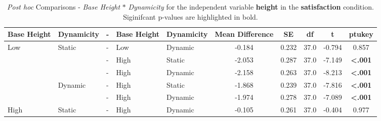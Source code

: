 \begin{table*}[ht]
    \centering
    \caption{\textit{Post hoc} Comparisons - \textit{Base Height} $\ast$ \textit{Dynamicity} for the independent variable \textbf{height} in the \textbf{satisfaction} condition. Siginifcant p-values are highlighted in bold.}
    \begin{tabular}{lllll|ccccc}
    \toprule
    \textbf{Base Height} & \textbf{Dynamicity} & -  & \textbf{Base Height} & \textbf{Dynamicity} & \textbf{Mean Difference} & \textbf{SE} & \textbf{df} & \textbf{t} & \textbf{ptukey} \\
    \midrule
    Low                  & Static              & - & Low                   & Dynamic             & -0.184                   & 0.232       & 37.0        & -0.794     & 0.857           \\
                         &                     & - & High                  & Static              & -2.053                   & 0.287       & 37.0        & -7.149     & \textbf{<.001}                      \\
                         &                     & - & High                  & Dynamic             & -2.158                   & 0.263       & 37.0        & -8.213     & \textbf{<.001}                      \\
                         & Dynamic             & - & High                  & Static              & -1.868                   & 0.239       & 37.0        & -7.816     & \textbf{<.001}                      \\
                         &                     & - & High                  & Dynamic             & -1.974                   & 0.278       & 37.0        & -7.089     & \textbf{<.001}                      \\
    High                 & Static              & - & High                  & Dynamic             & -0.105                   & 0.261       & 37.0        & -0.404     & 0.977             \\
    \bottomrule                           
    \end{tabular}
\end{table*}


